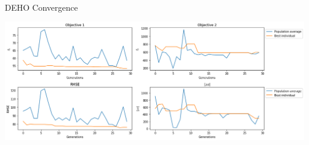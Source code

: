 \documentclass{beamer}
\begin{document}
\begin{frame}{DEHO Convergence}
\includegraphics[width=\textwidth,height=6cm]{figures/deho_convergence.png}
\end{frame}
\end{document}
